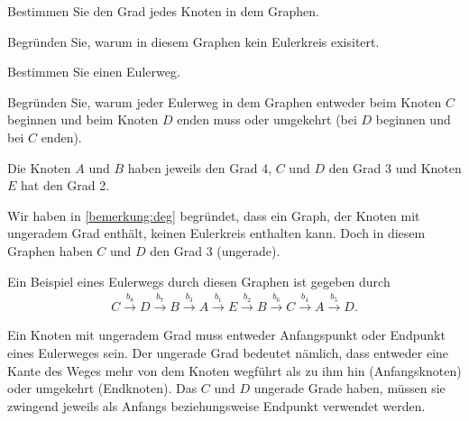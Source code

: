 \clearpage
\begin{myexercise}\label{aufgabe:06}
\begin{figure}[H]
     \centering
{}%
\end{figure}
\begin{aenum}
\item Bestimmen Sie den Grad jedes Knoten in dem Graphen.
\item Begründen Sie, warum in diesem Graphen kein Eulerkreis exisitert.
\item Bestimmen Sie einen Eulerweg.
\item Begründen Sie, warum jeder Eulerweg in dem Graphen entweder beim Knoten $C$ beginnen und beim Knoten $D$ enden muss oder umgekehrt (bei $D$ beginnen und bei $C$ enden).
\end{aenum}
\begin{myanswer}\label{aufgabe:06-sol}
\begin{aenum}
    \item Die Knoten $A$ und $B$ haben jeweils den Grad 4, $C$ und $D$ den Grad 3 und Knoten $E$ hat den Grad 2.
    \item Wir haben in \cref{bemerkung:deg} begründet, dass ein Graph, der Knoten mit ungeradem Grad enthält, keinen Eulerkreis enthalten kann. Doch in diesem Graphen haben $C$ und $D$ den Grad 3 (ungerade).
    \item Ein Beispiel eines Eulerwegs durch diesen Graphen ist gegeben durch
    \begin{align*}
        C \stackrel{b_8}{\longrightarrow} D \stackrel{b_7}{\longrightarrow} B \stackrel{b_3}{\longrightarrow} A \stackrel{b_1}{\longrightarrow} E \stackrel{b_2}{\longrightarrow} B \stackrel{b_6}{\longrightarrow} C
        \stackrel{b_4}{\longrightarrow} A \stackrel{b_5}{\longrightarrow} D.
    \end{align*}
    \item Ein Knoten mit ungeradem Grad muss entweder Anfangspunkt oder Endpunkt eines Eulerweges sein. Der ungerade Grad bedeutet nämlich, dass entweder eine Kante des Weges mehr von dem Knoten wegführt als zu ihm hin (Anfangsknoten) oder umgekehrt (Endknoten). Das $C$ und $D$ ungerade Grade haben, müssen sie zwingend jeweils als Anfangs beziehungsweise Endpunkt verwendet werden.
\end{aenum}
\end{myanswer}
\end{myexercise}


